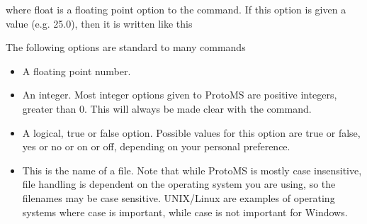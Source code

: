 \documentclass[letterpaper,10pt,english]{sphinxmanual}
\begin{document}
where float is a floating point option to the command. If this option is given a value (e.g. 25.0), then it is written like this

%
\begin{sphinxVerbatim}[commandchars=\\\{\}]
 
\end{sphinxVerbatim}

The following options are standard to many commands
\begin{itemize}
\item {} 
 A floating point number.

\item {} 
 An integer. Most integer options given to ProtoMS are positive integers, greater than 0. This will always be made clear with the command.

\item {} 
 A logical, true or false option. Possible values for this option are true or false, yes or no or on or off, depending on your personal preference.

\item {} 
 This is the name of a file. Note that while ProtoMS is mostly case insensitive, file handling is dependent on the operating system you are using, so the filenames may be case sensitive. UNIX/Linux are examples of operating systems where case is important, while case is not important for Windows.

\end{itemize}
\end{document}
